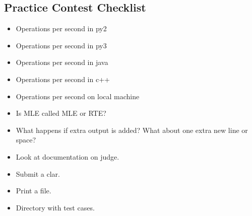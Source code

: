 \documentclass[8pt,a4paper,landscape,oneside]{amsart}
\begin{document}
\begin{multicols*}{2}
\begin{large}
\section{Practice Contest Checklist}
\begin{itemize}
    \item Operations per second in py2
    \item Operations per second in py3
    \item Operations per second in java
    \item Operations per second in c++
    \item Operations per second on local machine
    \item Is MLE called MLE or RTE?
    \item What happens if extra output is added? What about one extra new line or space?
    \item Look at documentation on judge.
    \item Submit a clar.
    \item Print a file.
    \item Directory with test cases.
\end{itemize}
\renewcommand{\labelitemi}{\textendash}

\end{large}
\end{multicols*}
\end{document}
